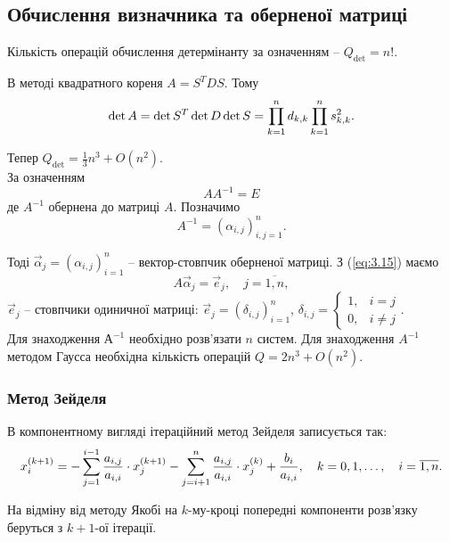 \subsection{Обчислення визначника та оберненої матриці}

Кількість операцій обчислення детермінанту за означенням -- $Q_{\det} = n!$. 

В методі квадратного кореня $A = S^T D S$. Тому 
\begin{equation}
	\label{eq:3.14}
	\det A = \det S^T \det D \det S = \displaystyle\prod\limits_{k=1}^n d_{k,k} \displaystyle\prod\limits_{k=1}^n s_{k,k}^2.
\end{equation}

Тепер $Q_{\det} = \frac 13 n^3 + O(n^2)$. \\

За означенням 
\begin{equation}
	\label{eq:3.15}
	AA^{-1} = E
\end{equation}
де $A^{-1}$ обернена до матриці $A$. Позначимо
\[ A^{-1} = (\alpha_{i,j})_{i,j=1}^n.\] 

Тоді $\vec \alpha_j = (\alpha_{i,j})_{i=1}^n$ -- вектор-стовпчик оберненої матриці. З (\ref{eq:3.15}) маємо
\begin{equation}
	\label{eq:3.16}
	A \vec \alpha_j = \vec e_j, \quad j = \overline{1, n},
\end{equation}
$\vec e_j$ -- стовпчики одиничної матриці: $\vec e_j = (\delta_{i,j})_{i=1}^n$, $\delta_{i,j} = \begin{cases} 1, & i = j \\ 0, & i \ne j \end{cases}$. \\

Для знаходження $А^{-1}$ необхідно розв'язати $n$ систем. Для знаходження $A^{-1}$ методом Гаусса необхідна кількість операцій $Q = 2n^3 + O(n^2)$.

\subsubsection{Метод Зейделя}
В компонентному вигляді ітераційний метод Зейделя записується так:
\begin{equation}
	\label{eq:4.10}
	x_i^{(k+1)} = -\displaystyle\sum\limits_{j=1}^{i-1} \dfrac{a_{i,j}}{a_{i,i}} \cdot x_j^{(k+1)} - \displaystyle\sum\limits_{j=i+1}^n \dfrac{a_{i,j}}{a_{i,i}} \cdot x_j^{(k)} + \dfrac{b_i}{a_{i,i}}, \quad k = 0,1,\ldots, \quad i=\overline{1,n}.
\end{equation}

На відміну від методу Якобі на $k$-му-кроці попередні компоненти розв'язку беруться з $k+1$-ої ітерації. \\

